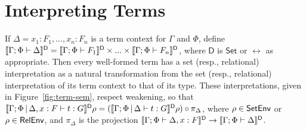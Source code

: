 \documentclass[runningheads]{llncs}
\newcommand{\set}{\mathsf{Set}}
\begin{document}
\vspace*{-0.25in}

\section{Interpreting Terms}\label{sec:term-interp}

\vspace*{-0.1in}

If $\Delta = x_1 : F_1,...,x_n : F_n$ is a term context for $\Gamma$
and $\Phi$, define $\llbracket{\Gamma;\Phi \vdash \Delta}\rrbracket^{\mathsf{D}} =
\llbracket{\Gamma;\Phi \vdash F_1}\rrbracket^{\mathsf{D}} \times ... \times
\llbracket{\Gamma;\Phi \vdash F_n}\rrbracket^{\mathsf{D}}$, where $\mathsf D$ is
$\set$ or $\rel$ as appropriate. Then every well-formed term has a set
(resp., relational) interpretation as a natural transformation from
the set (resp., relational) interpretation of its term context to that
of its type. These interpretations, given in
Figure~\ref{fig:term-sem}, respect weakening, so that
$\llbracket{\Gamma;\Phi \,|\, \Delta, x : F \vdash t : G}\rrbracket^{\mathsf D}\rho =
(\llbracket{\Gamma;\Phi \,|\, \Delta \vdash t : G}\rrbracket^{\mathsf D}\rho) \circ
\pi_{\Delta}$, where $\rho \in \mathsf{SetEnv}$ or $\rho \in\mathsf{RelEnv}$, and
$\pi_{\Delta}$ is the projection $\llbracket{\Gamma;\Phi \vdash \Delta, x :
  F}\rrbracket^{\mathsf D} \to \llbracket{\Gamma;\Phi \vdash \Delta}\rrbracket^{\mathsf D}$.
\end{document}
